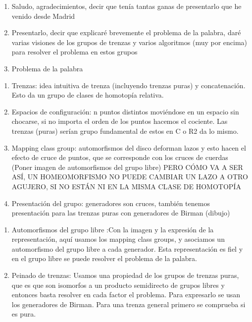 \documentclass{beamer}
\theoremstyle{definition}
\begin{document}
\begin{frame}
\begin{enumerate}
\item Saludo, agradecimientos, decir que tenía tantas ganas de presentarlo que he venido desde Madrid
\item Presentarlo, decir que explicaré brevemente el problema de la palabra, daré varias visiones de los grupos de trenzas y varios algoritmos (muy por encima) para resolver el problema en estos grupos
\item Problema de la palabra
\seti
\end{enumerate}
\end{frame}
\begin{frame}
\begin{enumerate}
\conti
\item Trenzas: idea intuitiva de trenza (incluyendo trenzas puras) y concatenación. Esto da un grupo de clases de homotopía relativa.
\item Espacios de configuración: n puntos distintos moviéndose en un espacio sin chocarse, si no importa el orden de los puntos hacemos el cociente. Las trenzas (puras) serían grupo fundamental de estos en C o R2 da lo mismo. 
\item Mapping class group: automorfismos del disco deforman lazos y esto hacen el efecto de cruce de puntos, que se corresponde con los cruces de cuerdas (Poner imagen de automorfismos del grupo libre) PERO CÓMO VA A SER ASÍ, UN HOMEOMORFISMO NO PUEDE CAMBIAR UN LAZO A OTRO AGUJERO, SI NO ESTÁN NI EN LA MISMA CLASE DE HOMOTOPÍA
\item Presentación del grupo: generadores son cruces, también tenemos presentación para las trenzas puras con generadores de Birman (dibujo)
\seti
\end{enumerate}
\end{frame}
\begin{frame}
\begin{enumerate}
\conti
\item Automorfismos del grupo libre :Con la imagen y la expresión de la representación, aquí usamos los mapping class groups, y asociamos un automorfismo del grupo libre a cada generador. Esta representación es fiel y en el grupo libre se puede resolver el problema de la palabra. 
\item Peinado de trenzas: Usamos una propiedad de los grupos de trenzas puras, que es que son isomorfos a un producto semidirecto de grupos libres y entonces basta resolver en cada factor el problema. Para expresarlo se usan los generadores de Birman. Para una trenza general primero se comprueba si es pura.
\seti

\end{enumerate}
\end{frame}
\end{document}
